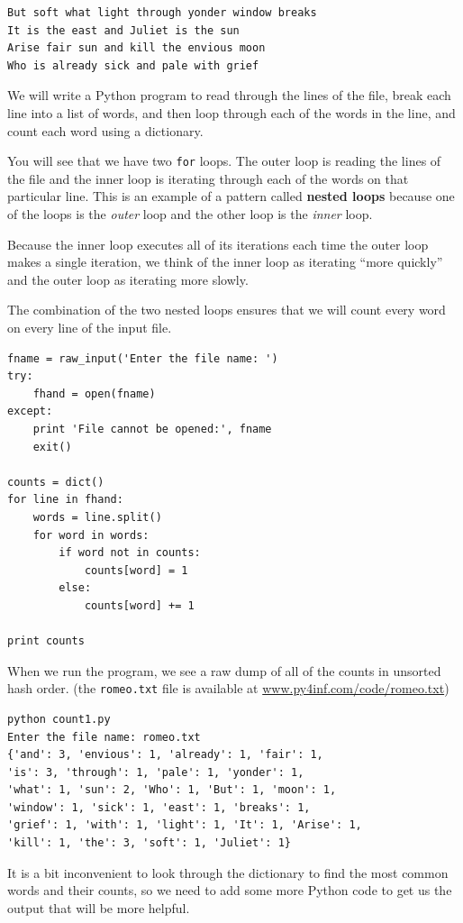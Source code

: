 \documentclass[10pt]{book}
\begin{document}
\beforeverb
\begin{verbatim}
But soft what light through yonder window breaks
It is the east and Juliet is the sun
Arise fair sun and kill the envious moon
Who is already sick and pale with grief
\end{verbatim}
\afterverb
%
We will write a Python program to read through the lines of the file, 
break each line into a list of words, and then loop through each 
of the words in the line, and count each word using a dictionary.

You will see that we have two {\tt for} loops.  The outer loop is reading the
lines of the file and the inner loop is iterating through each
of the words on that particular line.  This is an example
of a pattern called {\bf nested loops} because one of the loops
is the {\em outer} loop and the other loop is the {\em inner}
loop.  

Because the inner loop executes all of its iterations each time
the outer loop makes a single iteration, we think of the inner
loop as iterating ``more quickly'' and the outer loop as iterating 
more slowly.

The combination of the two nested loops ensures that we will count
every word on every line of the input file.

\beforeverb
\begin{verbatim}
fname = raw_input('Enter the file name: ')
try:
    fhand = open(fname)
except:
    print 'File cannot be opened:', fname
    exit()

counts = dict()
for line in fhand:
    words = line.split()
    for word in words:
        if word not in counts:
            counts[word] = 1
        else:
            counts[word] += 1

print counts
\end{verbatim}
\afterverb
%
When we run the program, we see a raw dump of all of the counts in unsorted
hash order.
(the {\tt romeo.txt} file is available at
\url{www.py4inf.com/code/romeo.txt})

\beforeverb
\begin{verbatim}
python count1.py 
Enter the file name: romeo.txt
{'and': 3, 'envious': 1, 'already': 1, 'fair': 1, 
'is': 3, 'through': 1, 'pale': 1, 'yonder': 1, 
'what': 1, 'sun': 2, 'Who': 1, 'But': 1, 'moon': 1, 
'window': 1, 'sick': 1, 'east': 1, 'breaks': 1, 
'grief': 1, 'with': 1, 'light': 1, 'It': 1, 'Arise': 1, 
'kill': 1, 'the': 3, 'soft': 1, 'Juliet': 1}
\end{verbatim}
\afterverb
%
It is a bit inconvenient to look through the dictionary to find the
most common words and their counts, so we need to add some more 
Python code to get us the output that will be more helpful.
\end{document}
